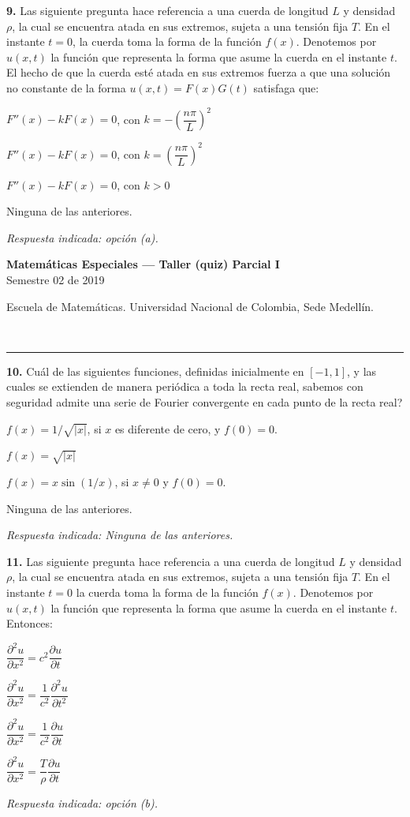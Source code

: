 \documentclass[11pt]{article}
\newcommand{\examheader}{%
  \noindent
  \begin{minipage}[t]{0.6\linewidth}
    {\small\bfseries Matem\'aticas Especiales --- Taller (quiz) Parcial I}\\
    {\small Semestre 02 de 2019}
  \end{minipage}%
  \hfill
  \begin{minipage}[t]{0.35\linewidth}
    \raggedleft\small Escuela de Matem\'aticas. Universidad Nacional de Colombia, Sede Medell\'in.
  \end{minipage}\\[2pt]
  \rule{\linewidth}{0.6pt}
}
\begin{document}
\vspace{10pt}
\textbf{9.} Las siguiente pregunta hace referencia a una cuerda de longitud $L$ y densidad $\rho$, la cual se encuentra atada en sus extremos, sujeta a una tensi\'on fija $T$. En el instante $t=0$, la cuerda toma la forma de la funci\'on $f(x)$. Denotemos por $u(x,t)$ la funci\'on que representa la forma que asume la cuerda en el instante $t$. El hecho de que la cuerda est\'e atada en sus extremos fuerza a que una soluci\'on no constante de la forma $u(x,t) = F(x)G(t)$ satisfaga que:
\begin{opciones}
  \item $F''(x) - kF(x) = 0$, con $k = -\left(\dfrac{n\pi}{L}\right)^2$
  \item $F''(x) - kF(x) = 0$, con $k = \left(\dfrac{n\pi}{L}\right)^2$
  \item $F''(x) - kF(x) = 0$, con $k>0$
  \item Ninguna de las anteriores.
\end{opciones}
\textit{Respuesta indicada: opci\'on (a).}

\clearpage
\examheader
\vspace{6pt}

\textbf{10.} \textquestiondown Cu\'al de las siguientes funciones, definidas inicialmente en $[-1,1]$, y las cuales se extienden de manera peri\'odica a toda la recta real, sabemos con seguridad admite una serie de Fourier convergente en cada punto de la recta real?
\begin{opciones}
  \item $f(x) = 1/\sqrt{|x|}$, si $x$ es diferente de cero, y $f(0)=0$.
  \item $f(x) = \sqrt{|x|}$
  \item $f(x) = x\sin(1/x)$, si $x\neq 0$ y $f(0)=0$.
  \item Ninguna de las anteriores.
\end{opciones}
\textit{Respuesta indicada: Ninguna de las anteriores.}

\vspace{10pt}
\textbf{11.} Las siguiente pregunta hace referencia a una cuerda de longitud $L$ y densidad $\rho$, la cual se encuentra atada en sus extremos, sujeta a una tensi\'on fija $T$. En el instante $t=0$ la cuerda toma la forma de la funci\'on $f(x)$. Denotemos por $u(x,t)$ la funci\'on que representa la forma que asume la cuerda en el instante $t$. Entonces:
\begin{opciones}
  \item $\dfrac{\partial^2 u}{\partial x^2} = c^2\dfrac{\partial u}{\partial t}$
  \item $\dfrac{\partial^2 u}{\partial x^2} = \dfrac{1}{c^2}\dfrac{\partial^2 u}{\partial t^2}$
  \item $\dfrac{\partial^2 u}{\partial x^2} = \dfrac{1}{c^2}\dfrac{\partial u}{\partial t}$
  \item $\dfrac{\partial^2 u}{\partial x^2} = \dfrac{T}{\rho}\dfrac{\partial u}{\partial t}$
\end{opciones}
\textit{Respuesta indicada: opci\'on (b).}
\end{document}
